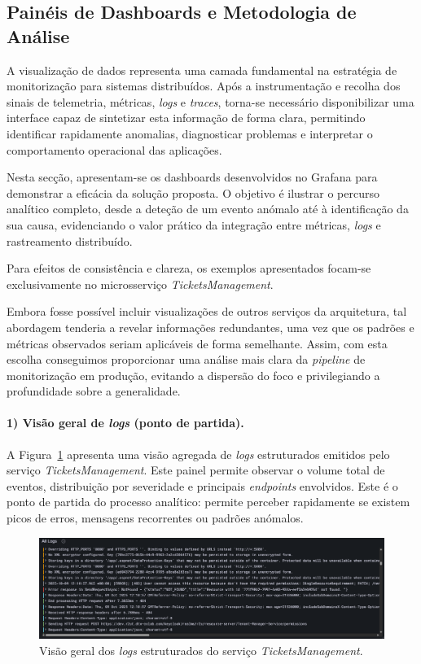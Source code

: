 \subsection{Painéis de Dashboards e Metodologia de Análise}

A visualização de dados representa uma camada fundamental na estratégia de monitorização 
para sistemas distribuídos. Após a instrumentação e recolha dos sinais de telemetria, métricas, \textit{logs} e \textit{traces}, torna-se necessário disponibilizar uma interface 
capaz de sintetizar esta informação de forma clara, permitindo identificar rapidamente 
anomalias, diagnosticar problemas e interpretar o comportamento operacional das aplicações.

Nesta secção, apresentam-se os dashboards desenvolvidos no Grafana para demonstrar a 
eficácia da solução proposta. O objetivo é ilustrar o percurso analítico completo, desde 
a deteção de um evento anómalo até à identificação da sua causa, evidenciando o valor 
prático da integração entre métricas, \textit{logs} e rastreamento distribuído.

Para efeitos de consistência e clareza, os exemplos apresentados focam-se exclusivamente no 
microsserviço \textit{TicketsManagement}.

Embora fosse possível incluir visualizações de outros serviços da arquitetura, tal abordagem tenderia a revelar informações redundantes, uma vez que os padrões e métricas observados seriam aplicáveis de forma semelhante. Assim, com esta escolha conseguimos proporcionar uma análise mais clara da \textit{pipeline} de monitorização em produção, evitando a dispersão do foco e privilegiando a profundidade sobre a generalidade.

\paragraph{1) Visão geral de \textit{logs} (ponto de partida).}

A Figura~\ref{fig:dash-1} apresenta uma visão agregada de \textit{logs} estruturados emitidos pelo 
serviço \textit{TicketsManagement}. Este painel permite observar o volume total de eventos, 
distribuição por severidade e principais \textit{endpoints} envolvidos. Este é o ponto de partida do processo analítico: permite perceber rapidamente se existem picos de erros, mensagens recorrentes ou padrões anómalos.

\begin{figure}[H]
    \centering
    \includegraphics[width=\textwidth]{images/Grafana/all_logs_dashboard.png}
    \caption{Visão geral dos \textit{logs} estruturados do serviço \textit{TicketsManagement}.}
    \label{fig:dash-1}
\end{figure}

